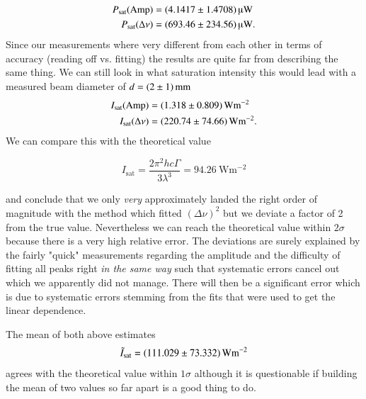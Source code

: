\documentclass[11pt,a4paper,notitlepage]{scrartcl}
\begin{document}
\begin{align*}
	P_\text{sat}(\text{Amp})&=\SI{4.1417\pm1.4708}{\micro\W}\\
	P_\text{sat}(\Delta\nu)&=\SI{693.46\pm234.56}{\micro\W}.
\end{align*}
Since our measurements where very different from each other in terms of accuracy (reading off vs. fitting) the results are quite far from describing the same thing. We can still look in what saturation intensity this would lead with a measured beam diameter of $d=\SI{2\pm1}{\milli\meter}$
\begin{align*}
	I_\text{sat}(\text{Amp})&=\SI{1.318\pm0.809}{\W\m^{-2}}\\
	I_\text{sat}(\Delta\nu)&=\SI{220.74\pm74.66}{\W\m^{-2}}.
\end{align*}
We can compare this with the theoretical value \cite{manual,87d}

$$I_\text{sat}=\frac{2\pi^2hc\Gamma}{3\lambda^3}=\SI{94.26}{\W\m^{-2}}$$

and conclude that we only \emph{very} approximately landed the right order of magnitude with the method which fitted $(\Delta\nu)^2$ but we deviate a factor of 2 from the true value. Nevertheless we can reach the theoretical value within $2\sigma$ because there is a very high relative error. The deviations are surely explained by the fairly "quick" measurements regarding the amplitude and the difficulty of fitting all peaks right \emph{in the same way} such that systematic errors cancel out which we apparently did not manage.
There will then be a significant error which is due to systematic errors stemming from the fits that were used to get the linear dependence.

 The mean of both above estimates $$\tilde{I}_\text{sat}=\SI{111.029\pm73.332}{\W\m^{-2}}$$ agrees with the theoretical value within $1\sigma$ although it is questionable if building the mean of two values so far apart is a good thing to do.


\newpage
\end{document}
